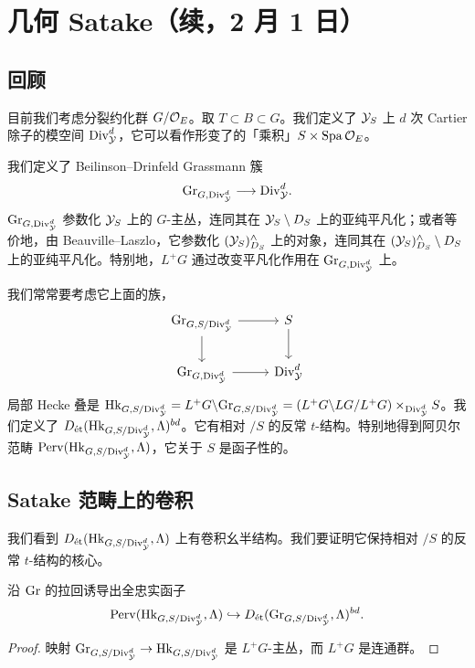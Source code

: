 \section[几何 Satake（续）]{几何 Satake（续，2 月 1 日）}


\subsection{回顾}

目前我们考虑分裂约化群 $G/\cO_E$。取 $T\subset B\subset G$。我们定义了 $\cY_S$ 上 $d$ 次 Cartier 除子的模空间 $\Div^d_{\cY}$，它可以看作形变了的「乘积」$S\times\Spa\cO_E$。

我们定义了 Beilinson--Drinfeld Grassmann 簇
\[
\Gr_{G,\Div^d_{\cY}}\longrightarrow\Div^d_{\cY}.
\]
$\Gr_{G,\Div^d_{\cY}}$ 参数化 $\cY_S$ 上的 $G$-主丛，连同其在 $\cY_S\setminus D_S$ 上的亚纯平凡化；或者等价地，由 Beauville--Laszlo，它参数化 $(\cY_S)^\wedge_{D_S}$ 上的对象，连同其在 $(\cY_S)^\wedge_{D_S}\setminus D_S$ 上的亚纯平凡化。特别地，$L^+G$ 通过改变平凡化作用在 $\Gr_{G,\Div^d_{\cY}}$ 上。

我们常常要考虑它上面的族，
\[
\begin{tikzcd}
\Gr_{G,S/\Div^d_{\cY}} \arrow[r] \arrow[d] & S \arrow[d] \\
\Gr_{G,\Div^d_{\cY}} \arrow[r] & \Div^d_{\cY}
\end{tikzcd}
\]
局部 Hecke 叠是 $\mathrm{Hk}_{G,S/\Div^d_{\cY}}=L^+G\backslash\Gr_{G,S/\Div^d_{\cY}}=(L^+G\backslash LG/L^+G)\times_{\Div^d_{\cY}}S$。我们定义了 $D_{\et}(\mathrm{Hk}_{G,S/\Div^d_{\cY}},\Lambda)^{bd}$。它有相对 $/S$ 的反常 $t$-结构。特别地得到阿贝尔范畴 $\Perv(\mathrm{Hk}_{G,S/\Div^d_{\cY}},\Lambda)$，它关于 $S$ 是函子性的。

\subsection{Satake 范畴上的卷积}

我们看到 $D_{\et}(\mathrm{Hk}_{G,S/\Div^d_{\cY}},\Lambda)$ 上有卷积幺半结构。我们要证明它保持相对 $/S$ 的反常 $t$-结构的核心。

\begin{proposition}
沿 $\Gr$ 的拉回诱导出全忠实函子
\[
\Perv(\mathrm{Hk}_{G,S/\Div^d_{\cY}},\Lambda)\hookrightarrow D_{\et}(\Gr_{G,S/\Div^d_{\cY}},\Lambda)^{bd}.
\]
\end{proposition}

\begin{proof}
映射 $\Gr_{G,S/\Div^d_{\cY}}\to\mathrm{Hk}_{G,S/\Div^d_{\cY}}$ 是 $L^+G$-主丛，而 $L^+G$ 是连通群。
\end{proof}

